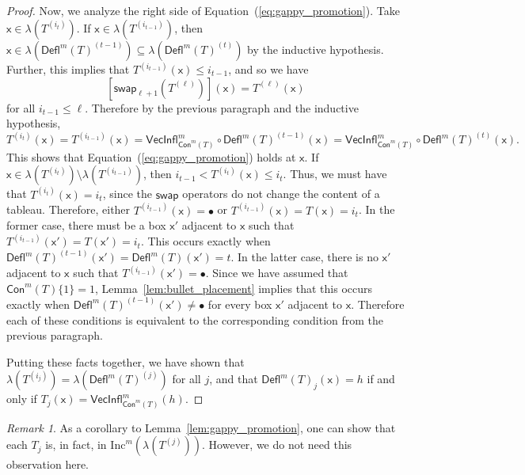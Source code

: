 \documentclass[12pt]{amsart}
\newcommand{\x}{\ensuremath{\mathsf{x}}}
\theoremstyle{definition}
\theoremstyle{remark}
\newtheorem{remark}[theorem]{Remark}
\numberwithin{equation}{section}
\newcommand{\inc}{\ensuremath{\mathrm{Inc}}}
\newcommand{\swap}{\ensuremath{\mathsf{swap}}}
\newcommand{\deflate}{\ensuremath{\mathsf{Defl}}}
\newcommand{\inflate}{\ensuremath{\mathsf{VecInfl}}}
\newcommand{\content}{\ensuremath{\mathsf{Con}}}
\begin{document}
\begin{proof}
Now, we analyze the right side of Equation~(\ref{eq:gappy_promotion}). Take $\x \in \lambda\left( T^{(i_t)} \right)$.   If $\x \in \lambda \left(T^{(i_{t-1})} \right)$, then $\x \in \lambda(\deflate^m(T)^{(t-1)}) \subseteq \lambda(\deflate^m(T)^{(t)})$ by the inductive hypothesis. Further, this implies that $T^{(i_{t-1})}(\x) \leq i_{t-1}$,  and so we have
\[
\left[ \swap_{\ell+1} \left(T^{(\ell)} \right) \right](\x) = T^{(\ell)}(\x)
\]
 for all $i_{t-1} \leq \ell$. Therefore by the previous paragraph and the inductive hypothesis,
 \[ T^{(i_t)}(\x) = T^{(i_{t-1})}(\x) = \inflate^m_{\content^m(T)} \circ \deflate^m(T)^{(t-1)}(\x) =  \inflate^m_{\content^m(T)} \circ \deflate^m(T)^{(t)}(\x). \] This shows that Equation~(\ref{eq:gappy_promotion}) holds at $\x$. If $\x \in \lambda \left(T^{(i_{t})} \right) \setminus \lambda \left(T^{(i_{t-1})} \right)$, then $i_{t-1} < T^{(i_{t})}(\x) \leq i_t$. Thus, we must have that $T^{(i_{t})}(\x) = i_{t}$, since the $\swap$ operators do not change the content of a tableau. Therefore, either $T^{(i_{t-1})}(\x) = \bullet$ or $T^{(i_{t-1})}(\x) =  T(\x) = i_{t}$. In the former case, there must be a box $\x'$ adjacent to $\x$ such that $T^{(i_{t-1})}(\x') = T(\x') = i_{t}$. This occurs exactly when $\deflate^m(T)^{(t-1)}(\x') = \deflate^m(T)(\x') = t$. In the latter case, there is no $\x'$ adjacent to $\x$ such that $T^{(i_{t-1})}(\x') = \bullet$. Since we have assumed that  $\content^m(T) \lbrace 1 \rbrace = 1$, Lemma~\ref{lem:bullet_placement} implies that this occurs exactly when  $\deflate^m(T)^{(t-1)}(\x') \neq \bullet$ for every box $\x'$ adjacent to $\x$. Therefore each of these conditions is equivalent to the corresponding condition from the previous paragraph. 
 
Putting these facts together, we have shown that $\lambda \left(T^{(i_j)} \right) = \lambda \left(\deflate^m(T)^{(j)} \right)$ for all $j$, and that $\deflate^m(T)_j(\x) = h$ if and only if $T_j(\x) = \inflate^m_{\content^m(T)}(h)$. 
\end{proof}

\begin{remark}
As a corollary to Lemma~\ref{lem:gappy_promotion}, one can show that each $T_j$ is, in fact, in $\inc^m \left(\lambda \left( T^{(j)} \right) \right)$. However, we do not need this observation here.
\end{remark}
\end{document}
